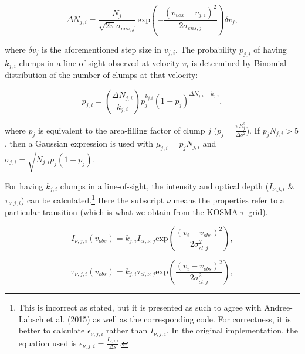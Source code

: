 \documentclass[a4paper]{article}
\newcommand{\kosmatau}{KOSMA-\(\tau\)}
\begin{document}
    \begin{equation}
    \label{delta Nji}
    \Delta N_{j,i} = \frac{N_j}{\sqrt{2 \pi} \sigma_{ens,j}} \ \mathrm{exp} \left( -\frac{(v_{vox}-v_{j,i})^2}{2 \sigma_{ens, j}} \right) \delta v_j,
    \end{equation}

    where \(\delta v_j\) is the aforementioned step size in \(v_{j,i}\).
    The probability \(p_{j,i}\) of having \(k_{j,i}\) clumps in a line-of-sight observed at velocity \(v_i\) is determined by Binomial distribution of the number of clumps at that velocity:

    \begin{equation}
    \label{combination probability}
    p_{j,i} = \binom{\Delta N_{j,i}}{k_{j,i}} p_j^{k_{j,i}} (1-p_j)^{\Delta N_{j,i}-k_{j,i}},
    \end{equation}

    where \(p_j\) is equivalent to the area-filling factor of clump \(j\) (\(p_j = \frac{\pi R_{j}^2}{\Delta s^2}\)).
    If \(p_j N_{j,i}>5\), then a Gaussian expression is used with \(\mu_{j,i} = p_j N_{j,i}\) and \(\sigma_{j,i} = \sqrt{N_{j,i} p_j (1-p_j)}\).

    For having \(k_{j,i}\) clumps in a line-of-sight, the intensity and optical depth (\(I_{\nu,j,i}\) \& \(\tau_{\nu,j,i}\)) can be calculated.\footnote{
        This is incorrect as stated, but it is presented as such to agree with Andree-Labsch et al. (2015) as well as the corresponding code. For correctness, it is better to calculate \(\epsilon_{\nu,j,i}\) rather than \(I_{\nu,j,i}\). In the original implementation, the equation used is \(\epsilon_{\nu,j,i} = \frac{I_{\nu,j,i}}{\Delta s}\).}
    Here the subscript \(\nu\) means the properties refer to a particular transition (which is what we obtain from the \kosmatau \ grid).

    \begin{equation}
    \label{los intensity}
    I_{\nu,j,i} (v_{obs}) = k_{j,i} I_{cl,\nu,j} \mathrm{exp} \left( \frac{(v_i-v_{obs})^2}{2\sigma_{cl, j}^2} \right),
    \end{equation}

    \begin{equation}
    \label{los optical depth}
    \tau_{\nu,j,i} (v_{obs}) = k_{j,i} \tau_{cl,\nu,j} \mathrm{exp} \left( \frac{(v_i-v_{obs})^2}{2\sigma_{cl, j}^2} \right),
    \end{equation}
\end{document}
